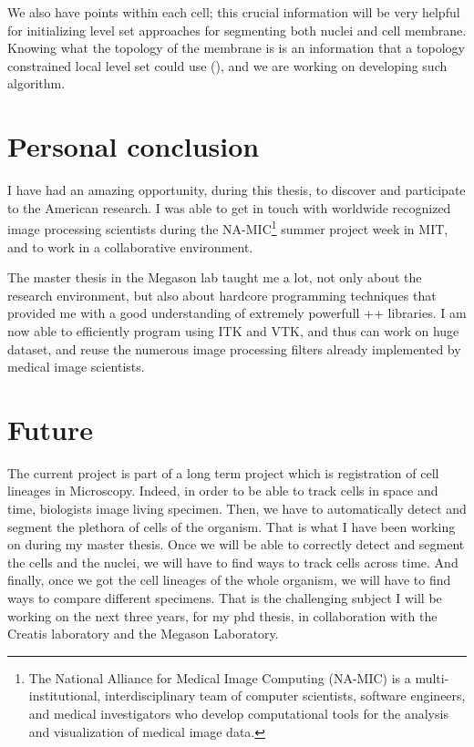 We also have points within each cell; this crucial information will be very helpful for initializing level set approaches for segmenting both nuclei and cell membrane.
Knowing what the topology of the membrane is is an information
that a topology constrained local level set could use (\cite{han2003topology,lankton2008localizing}), and we are working on developing such algorithm.


\section{Personal conclusion}

I have had an amazing opportunity, during this thesis,
to discover and participate to the American research.
I was able to get in touch with worldwide recognized
image processing scientists during the NA-MIC\footnote{
The National Alliance for Medical Image Computing (NA-MIC) is a multi-institutional, interdisciplinary team of computer scientists, software engineers, and medical investigators who develop computational tools for the analysis and visualization of medical image data.}
summer project week in MIT, and to work in a collaborative environment.

The master thesis in the Megason lab taught me a lot, not only about the research environment, but also about hardcore programming techniques that provided me with a good understanding of extremely powerfull \C++ libraries. I am now able to efficiently program using ITK and VTK, and thus can work on huge dataset, and reuse the numerous image processing filters already implemented by medical image scientists.

\section{Future}

The current project is part of a long term project which is registration of cell lineages in Microscopy.
Indeed, in order to be able to track cells in space and time, biologists image living specimen. Then, we have to automatically detect and segment the plethora of cells of the organism. That is what I have been working on during my master thesis.
Once we will be able to correctly detect and segment the cells and the nuclei, we will have to find ways to track cells across time. And finally, once we got the cell lineages of the whole organism, we will have to find ways to compare different specimens. That is the challenging subject I will be working on the next three years, for my phd thesis, in collaboration with the Creatis laboratory and the Megason Laboratory.


